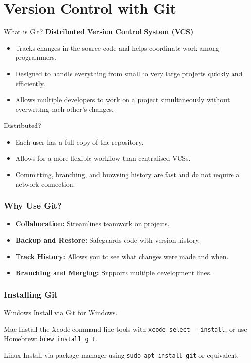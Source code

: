 \section{Version Control with Git}
\begin{frame}
	\begin{block}{What is Git?}
		\textbf{Distributed Version Control System (VCS)}
		\begin{itemize}
			\item Tracks changes in the source code and helps coordinate work among programmers.
			\item Designed to handle everything from small to very large projects quickly and efficiently.
			\item Allows multiple developers to work on a project simultaneously without overwriting each other's changes.
		\end{itemize}
	\end{block}

	\begin{block}{Distributed?}
		\justifying
		\begin{itemize}
			\item Each user has a full copy of the repository.
			\item Allows for a more flexible workflow than centralised VCSs.
			\item Committing, branching, and browsing history are fast and do not require a network connection.
		\end{itemize}
	\end{block}

\end{frame}


\begin{frame}
	\frametitle{Why Use Git?}
	\begin{itemize}
		\item \textbf{Collaboration:} Streamlines teamwork on projects.
		\item \textbf{Backup and Restore:} Safeguards code with version history.
		\item \textbf{Track History:} Allows you to see what changes were made and when.
		\item \textbf{Branching and Merging:} Supports multiple development lines.
	\end{itemize}
\end{frame}

\begin{frame}
	\frametitle{Installing Git}
	\begin{block}{Windows}
		Install via \href{https://git-scm.com/download/win}{Git for Windows}.
	\end{block}
	\begin{block}{Mac}
		Install the Xcode command-line tools with \texttt{xcode-select -{}-install}, or use Homebrew: \texttt{brew install git}.
	\end{block}
	\begin{block}{Linux}
		Install via package manager using \texttt{sudo apt install git} or equivalent.
	\end{block}
\end{frame}

